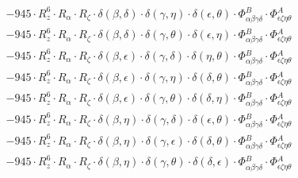 \documentclass{article}
\begin{document}
\begin{equation}
\begin{array}{c}
 \\[0.2em] 		 - 945 \cdot R_{z}^{6} \cdot R_{\alpha{}} \cdot R_{\zeta{}} \cdot \delta{}\left(\beta{}, \delta{}\right) \cdot \delta{}\left(\gamma{}, \eta{}\right) \cdot \delta{}\left(\epsilon{}, \theta{}\right) \cdot \Phi{}^{B}_{\alpha{}\beta{}\gamma{}\delta{}} \cdot \Phi{}^{A}_{\epsilon{}\zeta{}\eta{}\theta{}} 
 \\[0.2em] 		 - 945 \cdot R_{z}^{6} \cdot R_{\alpha{}} \cdot R_{\zeta{}} \cdot \delta{}\left(\beta{}, \delta{}\right) \cdot \delta{}\left(\gamma{}, \theta{}\right) \cdot \delta{}\left(\epsilon{}, \eta{}\right) \cdot \Phi{}^{B}_{\alpha{}\beta{}\gamma{}\delta{}} \cdot \Phi{}^{A}_{\epsilon{}\zeta{}\eta{}\theta{}} 
 \\[0.2em] 		 - 945 \cdot R_{z}^{6} \cdot R_{\alpha{}} \cdot R_{\zeta{}} \cdot \delta{}\left(\beta{}, \epsilon{}\right) \cdot \delta{}\left(\gamma{}, \delta{}\right) \cdot \delta{}\left(\eta{}, \theta{}\right) \cdot \Phi{}^{B}_{\alpha{}\beta{}\gamma{}\delta{}} \cdot \Phi{}^{A}_{\epsilon{}\zeta{}\eta{}\theta{}} 
 \\[0.2em] 		 - 945 \cdot R_{z}^{6} \cdot R_{\alpha{}} \cdot R_{\zeta{}} \cdot \delta{}\left(\beta{}, \epsilon{}\right) \cdot \delta{}\left(\gamma{}, \eta{}\right) \cdot \delta{}\left(\delta{}, \theta{}\right) \cdot \Phi{}^{B}_{\alpha{}\beta{}\gamma{}\delta{}} \cdot \Phi{}^{A}_{\epsilon{}\zeta{}\eta{}\theta{}} 
 \\[0.2em] 		 - 945 \cdot R_{z}^{6} \cdot R_{\alpha{}} \cdot R_{\zeta{}} \cdot \delta{}\left(\beta{}, \epsilon{}\right) \cdot \delta{}\left(\gamma{}, \theta{}\right) \cdot \delta{}\left(\delta{}, \eta{}\right) \cdot \Phi{}^{B}_{\alpha{}\beta{}\gamma{}\delta{}} \cdot \Phi{}^{A}_{\epsilon{}\zeta{}\eta{}\theta{}} 
 \\[0.2em] 		 - 945 \cdot R_{z}^{6} \cdot R_{\alpha{}} \cdot R_{\zeta{}} \cdot \delta{}\left(\beta{}, \eta{}\right) \cdot \delta{}\left(\gamma{}, \delta{}\right) \cdot \delta{}\left(\epsilon{}, \theta{}\right) \cdot \Phi{}^{B}_{\alpha{}\beta{}\gamma{}\delta{}} \cdot \Phi{}^{A}_{\epsilon{}\zeta{}\eta{}\theta{}} 
 \\[0.2em] 		 - 945 \cdot R_{z}^{6} \cdot R_{\alpha{}} \cdot R_{\zeta{}} \cdot \delta{}\left(\beta{}, \eta{}\right) \cdot \delta{}\left(\gamma{}, \epsilon{}\right) \cdot \delta{}\left(\delta{}, \theta{}\right) \cdot \Phi{}^{B}_{\alpha{}\beta{}\gamma{}\delta{}} \cdot \Phi{}^{A}_{\epsilon{}\zeta{}\eta{}\theta{}} 
 \\[0.2em] 		 - 945 \cdot R_{z}^{6} \cdot R_{\alpha{}} \cdot R_{\zeta{}} \cdot \delta{}\left(\beta{}, \eta{}\right) \cdot \delta{}\left(\gamma{}, \theta{}\right) \cdot \delta{}\left(\delta{}, \epsilon{}\right) \cdot \Phi{}^{B}_{\alpha{}\beta{}\gamma{}\delta{}} \cdot \Phi{}^{A}_{\epsilon{}\zeta{}\eta{}\theta{}} 

\end{array}
\end{equation}
\end{document}
